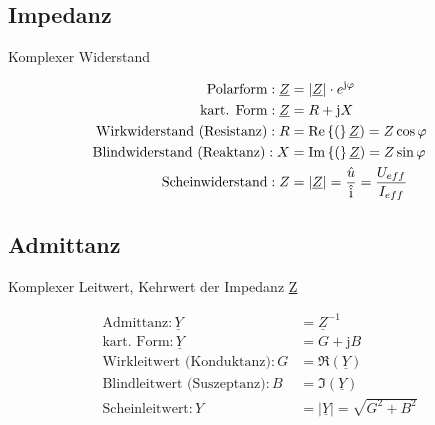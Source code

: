 \begin{sectionbox}
	
		\subsection{Impedanz}
		
		Komplexer Widerstand

		\begin{emphbox}
			\begin{align*}
				\text{Polarform}: {\underline {Z}} &= |{\underline {Z}}|\cdot e^{\mathrm {j} \varphi } \\
				\text{kart. Form}: \underline {Z} &= R + \mathrm {j} X \\
				\text{Wirkwiderstand (Resistanz)}: R &= \operatorname{Re}\left\{(\right\}\underline{Z}) = Z \cos \varphi \\
				\text{Blindwiderstand (Reaktanz)}: X &= \operatorname{Im}\left\{(\right\}\underline{Z}) = Z \sin \varphi \\
				\text{Scheinwiderstand}: Z &= |{\underline {Z}}| = \frac{\hat{u}}{\hat{\mathrm{i}}} = \frac{U_{eff}}{I_{eff}}
			\end{align*}
		\end{emphbox}
%	
		\subsection{Admittanz}
	
		Komplexer Leitwert, Kehrwert der Impedanz \underline {Z}
		\begin{emphbox}
			\begin{align*}
				\text{Admittanz}: {\underline {Y}} &= \underline {Z}^{-1} \\
				\text{kart. Form}: {\underline {Y}} &= G + \mathrm {j} B \\
				\text{Wirkleitwert (Konduktanz)}: G &= \Re(\underline {Y}) \\
				\text{Blindleitwert (Suszeptanz)}: B &= \Im(\underline {Y}) \\
				\text{Scheinleitwert}: Y &= |{\underline {Y}}| = \sqrt{G^2 + B^2}
			\end{align*}
		\end{emphbox}
	
\end{sectionbox}


